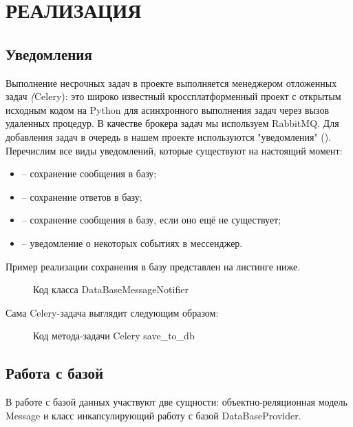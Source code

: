 \section{РЕАЛИЗАЦИЯ}
    \subsection{Уведомления}
    Выполнение несрочных задач в проекте выполняется менеджером отложенных задач \textit(Celery):
    это широко известный кроссплатформенный проект с открытым исходным кодом на Python для
    асинхронного выполнения задач через вызов удаленных процедур.
    В качестве брокера задач мы используем RabbitMQ\cite{docs.rabbitmq}.
    Для добавления задач в очередь в нашем проекте используются "уведомления" ().
    Перечислим все виды уведомлений, которые существуют на настоящий момент:
    \begin{itemize}
        \item {} -- сохранение сообщения в базу;
        \item {} -- сохранение ответов в базу;
        \item {} -- сохранение сообщения в базу, если оно ещё не существует;
        \item {} -- уведомление о некоторых событиях в мессенджер.
    \end{itemize}
    Пример реализации сохранения в базу представлен на листинге ниже.

    \begin{figure}[H]
        \centering
        
        \caption{Код класса DataBaseMessageNotifier}
        \label{fig:data_base_message_notifier}
    \end{figure}

    Сама Celery-задача выглядит следующим образом:

    \begin{figure}[H]
        \centering
        
        \caption{Код метода-задачи Celery save\_to\_db}
        \label{fig:celery_task}
    \end{figure}

    \subsection{Работа с базой}
    В работе с базой данных участвуют две сущности: объектно-реляционная модель Message
    и класс инкапсулирующий работу с базой DataBaseProvider.

